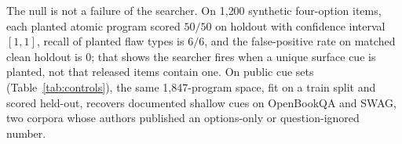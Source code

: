 The null is not a failure of the searcher. On 1{,}200 synthetic four-option items, each planted atomic program scored $50/50$ on holdout with confidence interval $[1, 1]$, recall of planted flaw types is $6/6$, and the false-positive rate on matched clean holdout is 0; that shows the searcher fires when a unique surface cue is planted, not that released items contain one. On public cue sets (Table~\ref{tab:controls}), the same 1{,}847-program space, fit on a train split and scored held-out, recovers documented shallow cues on OpenBookQA and SWAG, two corpora whose authors published an options-only or question-ignored number.

